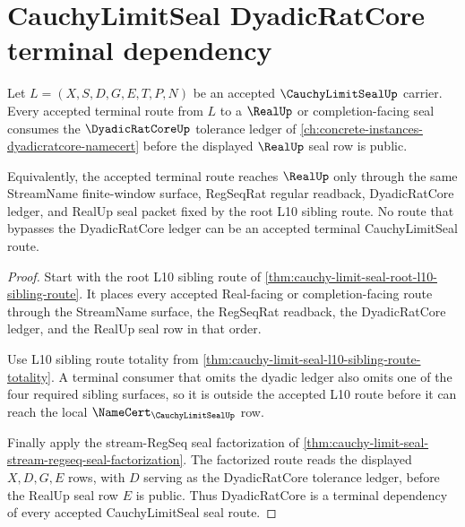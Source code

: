 \section{CauchyLimitSeal DyadicRatCore terminal dependency}
\label{sec:cauchy-limit-seal-dyadicratcore-terminal-dependency}

\begin{theorem}
\label{thm:cauchy-limit-seal-dyadicratcore-terminal-dependency}
Let $L=(X,S,D,G,E,T,P,N)$ be an accepted $\CauchyLimitSealUp$ carrier. Every accepted terminal route from $L$ to a $\RealUp$ or completion-facing seal consumes the $\DyadicRatCoreUp$ tolerance ledger of \autoref{ch:concrete-instances-dyadicratcore-namecert} before the displayed $\RealUp$ seal row is public.

Equivalently, the accepted terminal route reaches $\RealUp$ only through the same StreamName finite-window surface, RegSeqRat regular readback, DyadicRatCore ledger, and RealUp seal packet fixed by the root L10 sibling route. No route that bypasses the DyadicRatCore ledger can be an accepted terminal CauchyLimitSeal route.
\end{theorem}
\begin{proof}
Start with the root L10 sibling route of \autoref{thm:cauchy-limit-seal-root-l10-sibling-route}. It places every accepted Real-facing or completion-facing route through the StreamName surface, the RegSeqRat readback, the DyadicRatCore ledger, and the RealUp seal row in that order.

Use L10 sibling route totality from \autoref{thm:cauchy-limit-seal-l10-sibling-route-totality}. A terminal consumer that omits the dyadic ledger also omits one of the four required sibling surfaces, so it is outside the accepted L10 route before it can reach the local $\NameCert_{\CauchyLimitSealUp}$ row.

Finally apply the stream-RegSeq seal factorization of \autoref{thm:cauchy-limit-seal-stream-regseq-seal-factorization}. The factorized route reads the displayed $X,D,G,E$ rows, with $D$ serving as the DyadicRatCore tolerance ledger, before the RealUp seal row $E$ is public. Thus DyadicRatCore is a terminal dependency of every accepted CauchyLimitSeal seal route.
\end{proof}
